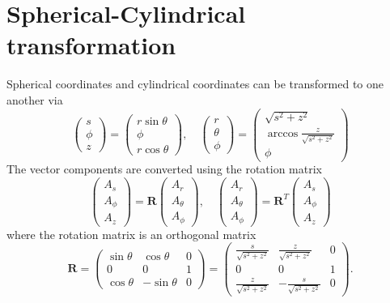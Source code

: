 \section{Spherical-Cylindrical transformation}

Spherical coordinates and cylindrical coordinates can be transformed to one another via
\begin{equation}
    \begin{pmatrix}
        s \\ \phi \\ z
    \end{pmatrix} = 
    \begin{pmatrix}
        r\sin\theta \\ \phi \\ r\cos\theta
    \end{pmatrix},\quad 
    \begin{pmatrix}
        r \\ \theta \\ \phi
    \end{pmatrix} = 
    \begin{pmatrix}
        \sqrt{s^2 + z^2} \\ \arccos \frac{z}{\sqrt{s^2 + z^2}} \\ \phi
    \end{pmatrix}
\end{equation}
The vector components are converted using the rotation matrix
\begin{equation}
    \begin{pmatrix} A_s \\ A_\phi \\ A_z \end{pmatrix} = \mathbf{R} 
    \begin{pmatrix} A_r \\ A_\theta \\ A_\phi \end{pmatrix},\quad
    \begin{pmatrix} A_r \\ A_\theta \\ A_\phi \end{pmatrix} = \mathbf{R}^T 
    \begin{pmatrix} A_s \\ A_\phi \\ A_z \end{pmatrix}
\end{equation}
where the rotation matrix is an orthogonal matrix
\begin{equation}
    \mathbf{R} = \begin{pmatrix}
        \sin\theta & \cos\theta & 0 \\ 
        0 & 0 & 1 \\ 
        \cos\theta & -\sin\theta & 0
    \end{pmatrix} = \begin{pmatrix}
        \frac{s}{\sqrt{s^2 + z^2}} & \frac{z}{\sqrt{s^2 + z^2}} & 0 \\ 
        0 & 0 & 1 \\ 
        \frac{z}{\sqrt{s^2 + z^2}} & -\frac{s}{\sqrt{s^2 + z^2}} & 0
    \end{pmatrix}.
\end{equation}
